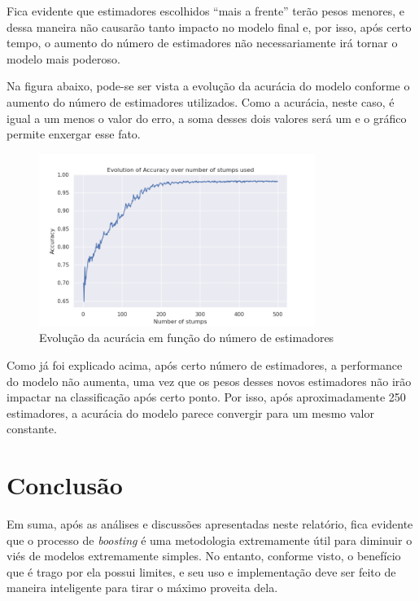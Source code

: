 \documentclass{article}
\begin{document}
Fica evidente que estimadores escolhidos \enquote{mais a frente} terão pesos
menores, e dessa maneira
não causarão tanto impacto no modelo final e, por isso, após certo tempo, o
aumento do número de estimadores
não necessariamente irá tornar o modelo mais poderoso.

Na figura abaixo, pode-se ser vista a evolução da acurácia do modelo conforme o
aumento do número de estimadores
utilizados. Como a acurácia, neste caso, é igual a um menos o valor do erro, a
soma desses dois valores será um e o
gráfico permite enxergar esse fato.

\begin{figure}[H]
    \centering
    \includegraphics[width=0.8\textwidth]{images/Accuracy.png}
    \caption{Evolução da acurácia em função do número de estimadores}
\end{figure}

Como já foi explicado acima, após certo número de estimadores, a performance do
modelo não
aumenta, uma vez que os pesos desses novos estimadores não irão impactar na
classificação após
certo ponto. Por isso, após aproximadamente 250 estimadores, a acurácia do
modelo parece convergir
para um mesmo valor constante.

\section{Conclusão}

Em suma, após as análises e discussões apresentadas neste relatório, fica
evidente que o
processo de \textit{boosting} é uma metodologia extremamente útil para diminuir
o viés de modelos
extremamente simples. No entanto, conforme visto, o benefício que é trago por
ela possui limites, e seu
uso e implementação deve ser feito de maneira inteligente para tirar o máximo
proveita dela.
\end{document}
